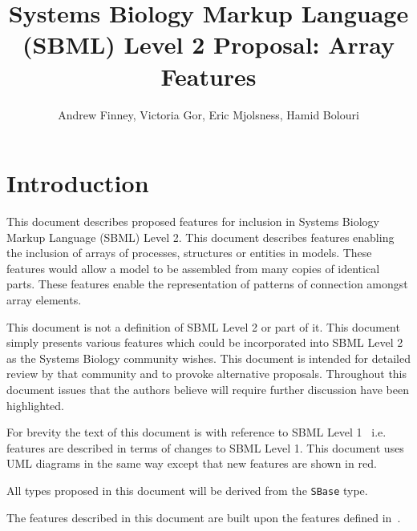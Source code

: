 \documentclass{cekarticle}
\begin{document}

\title{Systems Biology Markup Language (SBML) Level 2 Proposal: Array Features}

\author{Andrew Finney, Victoria Gor, Eric Mjolsness, Hamid Bolouri}


\maketitlepage

\section{Introduction}
\label{sec:introduction}

This document describes proposed features for inclusion in
Systems Biology Markup Language (SBML) Level 2. This document
describes features enabling the inclusion of arrays of processes,
structures or entities in models.  These features would allow a
model to be assembled from many copies of identical parts.  These
features enable the representation of patterns of connection
amongst array elements.

This document is not a definition of SBML Level 2 or part of it.
This document simply presents various features which could be
incorporated into SBML Level 2 as the Systems Biology community
wishes.  This document is intended for detailed review by that
community and to provoke alternative proposals.  Throughout this
document issues that the authors believe will require further
discussion have been highlighted.

For brevity the text of this document is with reference to SBML
Level 1~\citep{hucka:2001} i.e. features are described in terms
of changes to SBML Level 1.  This document uses UML diagrams in
the same way except that new features are shown in red.

All types proposed in this document will be derived from the
\texttt{SBase} type.

The features described in this document are built upon the
features defined in~\citet{finney:2002c}.
\end{document}
